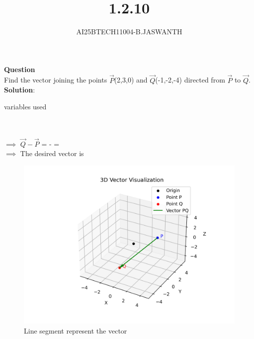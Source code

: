 \documentclass[journal]{IEEEtran}
\begin{document}

\vspace{3cm}


\renewcommand{\thetable}{\theenumi}




\vspace{3cm}


\title{1.2.10}
\author{AI25BTECH11004-B.JASWANTH}
{\let\newpage\relax\maketitle}


\renewcommand{\thefigure}{\theenumi}
\renewcommand{\thetable}{\theenumi}
\setlength{\intextsep}{10pt} %

\textbf{Question}\\
Find the vector joining the points $\Vec{P}$(2,3,0) and $\Vec{Q}$(-1,-2,-4) directed from $\vec{P}$  to $\vec{Q}$. \\
\textbf{Solution}: \\
\begin{table}[h!]
	\centering
	
	\caption{variables used}
	\label{}
\end{table}\\
 \\
    $\implies$ $\vec{Q}-\vec{P}$ =  -  =  \\
    $\implies$ The desired vector is  
 
\begin{figure}[h!]
 \centering
\includegraphics[width=0.7\linewidth]{figs/01.png}
\caption{Line segment represent the vector}
\label{stemplot}
\end{figure}
\end{document}
